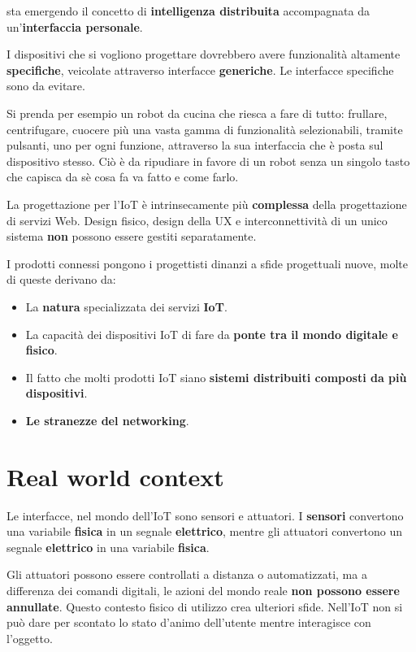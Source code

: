 \documentclass[a4paper,11pt,oneside]{book}
\begin{document}
sta emergendo il concetto di \textbf{intelligenza distribuita} accompagnata da un'\textbf{interfaccia personale}.

I dispositivi che si vogliono progettare dovrebbero avere funzionalità altamente \textbf{specifiche}, veicolate attraverso interfacce \textbf{generiche}. Le interfacce specifiche sono da evitare.

Si prenda per esempio un robot da cucina che riesca a fare
di tutto: frullare, centrifugare, cuocere più una vasta gamma di funzionalità selezionabili, tramite pulsanti, uno per ogni funzione, attraverso la sua interfaccia che è posta sul dispositivo stesso. Ciò è da ripudiare in favore di un robot senza un singolo tasto che capisca da sè cosa fa va fatto e come farlo.

La progettazione per l'IoT è intrinsecamente più \textbf{complessa} della progettazione di servizi Web. Design fisico, design della UX e interconnettività di un unico sistema \textbf{non} possono essere gestiti separatamente.

I prodotti connessi pongono i progettisti dinanzi a sfide progettuali nuove, molte di queste derivano da:

\begin{itemize}
	\item La \textbf{natura} specializzata dei servizi \textbf{IoT}.
	\item La capacità dei dispositivi IoT di fare da \textbf{ponte tra il mondo digitale e fisico}.
	\item Il fatto che molti prodotti IoT siano \textbf{sistemi distribuiti composti da più dispositivi}.
	\item \textbf{Le stranezze del networking}.
\end{itemize}

\pagebreak

\section{Real world context}
Le interfacce, nel mondo dell'IoT sono sensori e attuatori. I \textbf{sensori} convertono una variabile \textbf{fisica} in un segnale \textbf{elettrico}, mentre gli
attuatori convertono un segnale\textbf{ elettrico} in una variabile \textbf{fisica}.

Gli attuatori possono essere controllati a distanza o automatizzati, ma a differenza dei comandi digitali, le azioni del mondo reale \textbf{non possono essere annullate}.
Questo contesto fisico di utilizzo crea ulteriori sfide. Nell'IoT non si può dare per
scontato lo stato d'animo dell'utente mentre interagisce con l'oggetto.
\end{document}
